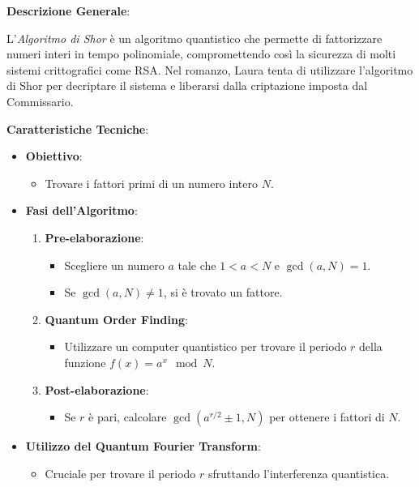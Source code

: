 \vspace{0.5cm}

\begin{tcolorbox}[colback=white,colframe=black,title=\textbf{Algoritmo di Shor}]
\begin{multicols}{2}
\textbf{Descrizione Generale}:

L'\emph{Algoritmo di Shor} è un algoritmo quantistico che permette di fattorizzare numeri interi in tempo polinomiale, compromettendo così la sicurezza di molti sistemi crittografici come RSA. Nel romanzo, Laura tenta di utilizzare l'algoritmo di Shor per decriptare il sistema e liberarsi dalla criptazione imposta dal Commissario.

\textbf{Caratteristiche Tecniche}:

\begin{itemize}
    \item \textbf{Obiettivo}:
    \begin{itemize}
        \item Trovare i fattori primi di un numero intero \( N \).
    \end{itemize}
    \item \textbf{Fasi dell'Algoritmo}:
    \begin{enumerate}
        \item \textbf{Pre-elaborazione}:
        \begin{itemize}
            \item Scegliere un numero \( a \) tale che \( 1 < a < N \) e \( \gcd(a, N) = 1 \).
            \item Se \( \gcd(a, N) \neq 1 \), si è trovato un fattore.
        \end{itemize}
        \item \textbf{Quantum Order Finding}:
        \begin{itemize}
            \item Utilizzare un computer quantistico per trovare il periodo \( r \) della funzione \( f(x) = a^x \mod N \).
        \end{itemize}
        \item \textbf{Post-elaborazione}:
        \begin{itemize}
            \item Se \( r \) è pari, calcolare \( \gcd(a^{r/2} \pm 1, N) \) per ottenere i fattori di \( N \).
        \end{itemize}
    \end{enumerate}
    \item \textbf{Utilizzo del Quantum Fourier Transform}:
    \begin{itemize}
        \item Cruciale per trovare il periodo \( r \) sfruttando l'interferenza quantistica.
    \end{itemize}
\end{itemize}


\end{multicols}
\end{tcolorbox}
